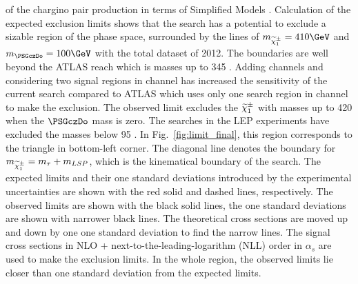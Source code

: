 of the chargino pair production in terms of Simplified Models \cite{alves:sms}. 
Calculation of the expected exclusion limits shows that the search has a potential to exclude 
a sizable region of the phase space, surrounded by the lines of $m_{\chione} = 410\GeV$ and $m_{\PSGczDo} = 100\GeV$ with 
the total dataset of 2012. The boundaries are well beyond the ATLAS reach which is \chione  masses up to 345 \GeV \cite{Aad:2014yka}.
Adding \leptonTau channels
and considering two signal regions in \tauTau channel has increased the sensitivity of the current search compared to ATLAS which uses only 
one search region in \tauTau channel to make the exclusion.
The observed limit excludes the $\widetilde{\chi}^{\pm}_1$ with masses up to 420 \GeV when the $\PSGczDo$ mass is zero.
The \sTau searches in the LEP experiments \cite{lepsusy} have excluded the masses below 95 \GeV. In Fig.~\ref{fig:limit_final}, 
this region corresponds to the triangle in bottom-left corner.
The diagonal line denotes the boundary for $m_{\widetilde{\chi}^{\pm}_1} = m_{\tau} + m_{LSP}$, which is the kinematical boundary of the search.
The expected limits and their one standard deviations introduced by the experimental 
uncertainties are shown with the red solid and dashed lines, respectively. The observed limits are shown with the black solid lines, the one 
standard deviations are shown with narrower black lines. The theoretical cross sections are moved up and down by one one standard deviation to 
find the narrow lines.
The signal cross sections in NLO + next-to-the-leading-logarithm (NLL) order in $\alpha_s$ are used to make the exclusion limits.
In the whole region, the observed limits lie closer than one standard deviation from the expected limits.  



